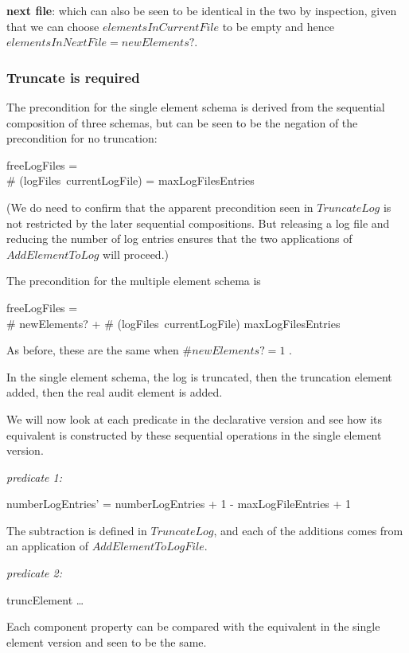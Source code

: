 {\bf next file}:
which can also be seen to be identical in the two by inspection,
given that we can choose $elementsInCurrentFile$ to be empty and hence
$elementsInNextFile = newElements?$.

\subsubsection{Truncate is required}
\label{refine:trunc}
The precondition for the single element schema is derived from the
sequential composition of three schemas,
but can be seen to be the negation of the precondition for no truncation:

\begin{argue}
	freeLogFiles = \emptyset
\\ 	\land \# (logFiles~currentLogFile) = maxLogFilesEntries
\end{argue}

(We do need to confirm that the apparent precondition seen in $TruncateLog$
is not restricted by the later sequential compositions.
But releasing a log file and reducing the number of log entries ensures
that the two applications of $AddElementToLog$ will proceed.)

The precondition for the multiple element schema is

\begin{argue}
	freeLogFiles = \emptyset
\\ 	\land \# newElements? + \# (logFiles~currentLogFile) \geq maxLogFilesEntries
\end{argue}
As before, these are the same when $\# newElements? = 1$ .

In the single element schema,
the log is truncated,
then the truncation element added,
then the real audit element is added.

We will now look at each predicate in the declarative version and see how its
equivalent is constructed by these sequential operations in the single element version.

{\em predicate 1:}
\begin{argue}
	numberLogEntries' = numberLogEntries + 1 - maxLogFileEntries + 1
\end{argue}
The subtraction is defined in $TruncateLog$,
and each of the additions comes from an application of $AddElementToLogFile$.

{\em predicate 2:}
\begin{argue}
	\exists truncElement \ldots
\end{argue}
Each component property can be compared with the equivalent in the single element
version and seen to be the same.

